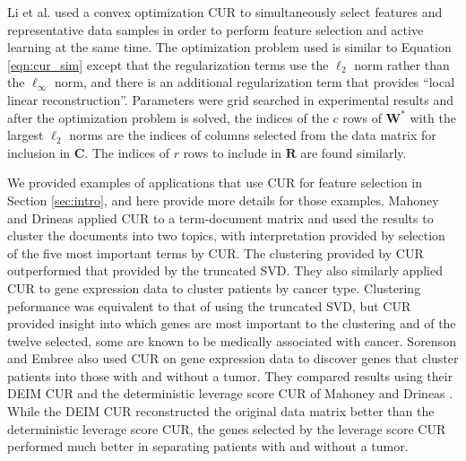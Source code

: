 \documentclass[12pt]{article}
\begin{document}
Li et al. \cite{li_etal_2019} used a convex optimization CUR to simultaneously select features and representative data samples in order to perform feature selection and active learning at the same time.  The optimization problem used is similar to Equation \ref{eqn:cur_sim} except that the regularization terms use the $\ell_2$ norm rather than the $\ell_{\infty}$ norm, and there is an additional regularization term that provides ``local linear reconstruction''.  Parameters were grid searched in experimental results and after the optimization problem is solved, the indices of the $c$ rows of $\mathbf{W}^*$ with the largest $\ell_{2}$ norms are the indices of columns selected from the data matrix for inclusion in $\mathbf{C}$.  The indices of $r$ rows to include in $\mathbf{R}$ are found similarly.  

We provided examples of applications that use CUR for feature selection in Section \ref{sec:intro}, and here provide more details for those examples.  Mahoney and Drineas \cite{mahoney_drineas_2009} applied CUR to a term-document matrix and used the results to cluster the documents into two topics, with interpretation provided by selection of the five most important terms by CUR.  The clustering provided by CUR outperformed that provided by the truncated SVD.  They also similarly applied CUR to gene expression data to cluster patients by cancer type.  Clustering peformance was equivalent to that of using the truncated SVD, but CUR provided insight into which genes are most important to the clustering and of the twelve selected, some are known to be medically associated with cancer.  Sorenson and Embree \cite{sorenson_embree_2016} also used CUR on gene expression data to discover genes that cluster patients into those with and without a tumor.  They compared results using their DEIM CUR and the deterministic leverage score CUR of Mahoney and Drineas \cite{mahoney_drineas_2009}.  While the DEIM CUR reconstructed the original data matrix better than the deterministic leverage score CUR, the genes selected by the leverage score CUR performed much better in separating patients with and without a tumor.  
\end{document}
